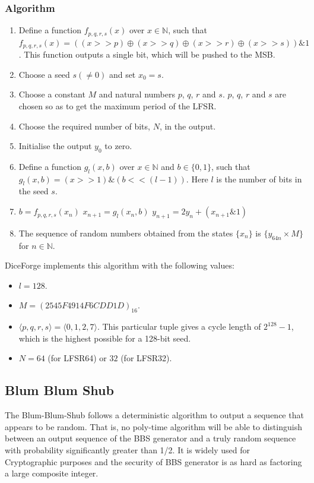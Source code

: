 \documentclass[titlepage, 11pt]{article}
\begin{document}
\subsubsection{Algorithm}
\begin{enumerate}
\item Define a function $f_{p, q, r, s}(x)$ over $x \in \mathbb{N}$, such that $f_{p, q, r, s}(x) = ((x >> p) \oplus (x >> q) \oplus (x >> r) \oplus (x >> s)) \mathbin{\&} 1$. This function outputs a single bit, which will be pushed to the MSB.
\item Choose a seed $s (\neq 0)$ and set $x_0 = s$.
\item Choose a constant $M$ and natural numbers $p$, $q$, $r$ and $s$. $p$, $q$, $r$ and $s$ are chosen so as to get the maximum period of the LFSR.
\item Choose the required number of bits, $N$, in the output.
\item Initialise the output $y_0$ to zero.
\item Define a function $g_l (x, b)$ over $x \in \mathbb{N}$ and $b \in \{0, 1\}$, such that $g_l (x, b) = (x >> 1) \& (b << (l - 1))$. Here $l$ is the number of bits in the seed $s$.
\item $b = f_{p, q, r, s}(x_n)$
\newline
$x_{n + 1} = g_l (x_n, b)$
\newline
$y_{n + 1} = 2y_n + (x_{n + 1} \mathbin{\&} 1)$
\item
The sequence of random numbers obtained from the states $\{x_n\}$ is $\{y_{64n} \times M\}$ for $n \in \mathbb{N}$.
\end{enumerate}
DiceForge implements this algorithm with the following values:
\begin{itemize}
    \item $l = 128$.
    \item $M = (2545F4914F6CDD1D)_{16}$.
    \item $\langle p, q, r, s \rangle = \langle 0, 1, 2, 7 \rangle$. This particular tuple gives a cycle length of $2^{128} - 1$, which is the highest possible for a 128-bit seed.
    \item $N = 64$ (for LFSR64) or $32$ (for LFSR32).
\end{itemize}


\subsection{Blum Blum Shub}
The Blum-Blum-Shub  follows a deterministic algorithm to output a sequence that appears to be random. That is, no poly-time algorithm will be able to distinguish between an output sequence of the BBS generator and a truly random sequence with probability significantly greater than 1/2. It is widely used for Cryptographic purposes and the security of BBS generator is as hard as factoring a large composite integer. 
\end{document}
